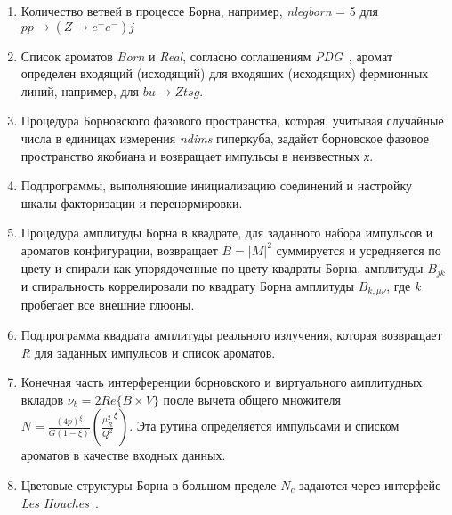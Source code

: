 \begin{enumerate}
	\item Количество ветвей в процессе Борна, например, \textit{nlegborn} = 5 для $pp \rightarrow (Z \rightarrow {e}^{+}{e}^{-}) j$
	\item Список ароматов \textit{Born} и \textit{Real}, согласно соглашениям \textit{PDG}~\cite{review-powheg}, аромат
	определен входящий (исходящий) для входящих (исходящих) фермионных линий, например, для $bu \rightarrow Ztsg$.
	\item Процедура Борновского фазового пространства, которая, учитывая случайные числа в единицах измерения \textit{ndims}
	гиперкуба, задайет борновское фазовое пространство якобиана и возвращает импульсы в неизвестных \textit{х}.
	\item Подпрограммы, выполняющие инициализацию соединений и настройку
	шкалы факторизации и перенормировки.
	\item Процедура амплитуды Борна в квадрате, для заданного набора импульсов и ароматов
	конфигурации, возвращает $B = {|M|}^{2}$
	суммируется и усредняется по цвету и спирали
	как упорядоченные по цвету квадраты Борна, амплитуды ${B}_{jk}$ и спиральность коррелировали по квадрату Борна
	амплитуды ${B}_{k,\mu\nu}$, где \textit{k} пробегает все внешние глюоны.
	\item Подпрограмма квадрата амплитуды реального излучения, которая возвращает \textit{R} для заданных импульсов и
	список ароматов.
	\item Конечная часть интерференции борновского и виртуального амплитудных вкладов ${\nu}_{b} = 2Re\{B\times V\}$ после вычета общего множителя $N = \frac{{(4p)}^\xi}{G(1-\xi)}({\frac{{\mu}_{R}^{2}}{{Q}^{2}}}^{\xi})$. Эта рутина определяется импульсами и списком ароматов в качестве входных данных.
	\item Цветовые структуры Борна в большом пределе ${N}_{c}$ задаются через интерфейс \textit{Les Houches}~\cite{review-powheg}.
\end{enumerate}

